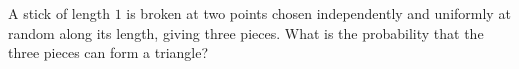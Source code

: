A stick of length $1$ is broken at two points chosen independently and uniformly at random along its length, giving three pieces. What is the probability that the three pieces can form a triangle?
